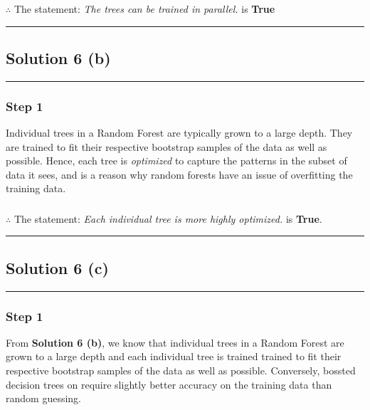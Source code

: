 \documentclass{article}
\begin{document}
\subsubsection*{\normalfont}{$\therefore$ The statement: \textit{The trees can be trained in parallel.} is \textbf{True} }

\noindent\rule{\textwidth}{0.4pt}

\newpage

\subsection*{Solution 6 (b)}
\noindent\rule{\textwidth}{0.4pt}

\subsubsection*{Step 1}
\parbox{\textwidth}{
Individual trees in a Random Forest are typically grown to a large depth. They are trained to fit their respective bootstrap samples of the data as well as possible. Hence, each tree is \textit{optimized} to capture the patterns in the subset of data it sees, and is a reason why random forests have an issue of overfitting the training data.
}

\subsubsection*{\normalfont}{$\therefore$ The statement: \textit{Each individual tree is more highly optimized.} is \textbf{True}.}

\noindent\rule{\textwidth}{0.4pt}

\newpage

\subsection*{Solution 6 (c)}
\noindent\rule{\textwidth}{0.4pt}

\subsubsection*{Step 1}
\parbox{\textwidth}{
From \textbf{Solution 6 (b)}, we know that individual trees in a Random Forest are grown to a large depth and each individual tree is trained trained to fit their respective bootstrap samples of the data as well as possible. 
Conversely, bossted decision trees on require slightly better accuracy on the training data than random guessing.
}
\end{document}
